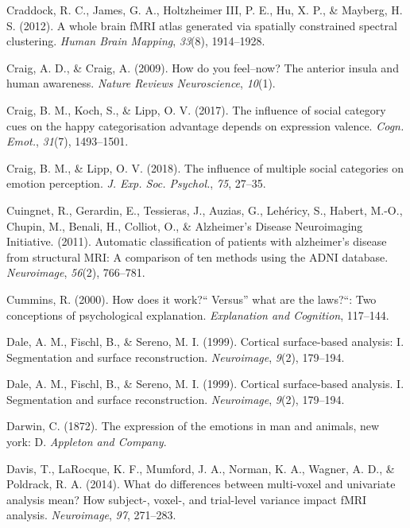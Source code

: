 \documentclass[11pt,american,a4paper,oneside,]{memoir} %
\begin{document}
\leavevmode\hypertarget{ref-craddock2012whole}{}%
Craddock, R. C., James, G. A., Holtzheimer III, P. E., Hu, X. P., \& Mayberg, H. S. (2012). A whole brain fMRI atlas generated via spatially constrained spectral clustering. \emph{Human Brain Mapping}, \emph{33}(8), 1914--1928.

\leavevmode\hypertarget{ref-craig2009you}{}%
Craig, A. D., \& Craig, A. (2009). How do you feel--now? The anterior insula and human awareness. \emph{Nature Reviews Neuroscience}, \emph{10}(1).

\leavevmode\hypertarget{ref-Craig2017-db}{}%
Craig, B. M., Koch, S., \& Lipp, O. V. (2017). The influence of social category cues on the happy categorisation advantage depends on expression valence. \emph{Cogn. Emot.}, \emph{31}(7), 1493--1501.

\leavevmode\hypertarget{ref-Craig2018-jm}{}%
Craig, B. M., \& Lipp, O. V. (2018). The influence of multiple social categories on emotion perception. \emph{J. Exp. Soc. Psychol.}, \emph{75}, 27--35.

\leavevmode\hypertarget{ref-Cuingnet2011-hv}{}%
Cuingnet, R., Gerardin, E., Tessieras, J., Auzias, G., Lehéricy, S., Habert, M.-O., Chupin, M., Benali, H., Colliot, O., \& Alzheimer's Disease Neuroimaging Initiative. (2011). Automatic classification of patients with alzheimer's disease from structural MRI: A comparison of ten methods using the ADNI database. \emph{Neuroimage}, \emph{56}(2), 766--781.

\leavevmode\hypertarget{ref-Cummins2000-pk}{}%
Cummins, R. (2000). How does it work?{}`` Versus'' what are the laws?{}``: Two conceptions of psychological explanation. \emph{Explanation and Cognition}, 117--144.

\leavevmode\hypertarget{ref-dale1999cortical}{}%
Dale, A. M., Fischl, B., \& Sereno, M. I. (1999). Cortical surface-based analysis: I. Segmentation and surface reconstruction. \emph{Neuroimage}, \emph{9}(2), 179--194.

\leavevmode\hypertarget{ref-Dale1999-rk}{}%
Dale, A. M., Fischl, B., \& Sereno, M. I. (1999). Cortical surface-based analysis. I. Segmentation and surface reconstruction. \emph{Neuroimage}, \emph{9}(2), 179--194.

\leavevmode\hypertarget{ref-Darwin1872-nv}{}%
Darwin, C. (1872). The expression of the emotions in man and animals, new york: D. \emph{Appleton and Company}.

\leavevmode\hypertarget{ref-Davis2014-lw}{}%
Davis, T., LaRocque, K. F., Mumford, J. A., Norman, K. A., Wagner, A. D., \& Poldrack, R. A. (2014). What do differences between multi-voxel and univariate analysis mean? How subject-, voxel-, and trial-level variance impact fMRI analysis. \emph{Neuroimage}, \emph{97}, 271--283.
\end{document}
